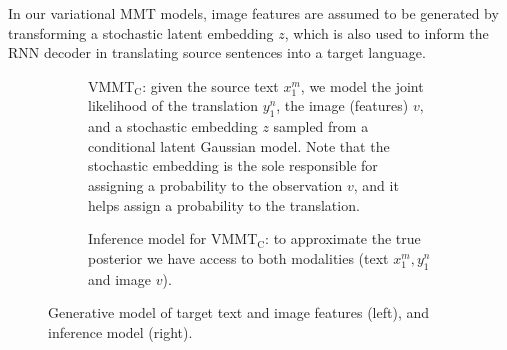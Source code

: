 \documentclass[11pt,a4paper]{article}
\newcommand{\cond}{VMMT$_{\text{C}}$\xspace}
\begin{document}
In our variational MMT models, image features are assumed to be generated by transforming a stochastic latent embedding $z$, which is 
also used to inform the RNN decoder in translating source sentences into a target language.

\begin{figure*}[ht!]
  \centering
  \begin{subfigure}[t]{0.45\linewidth}\centering
    \caption{\label{fig:vmmtc-gen}\cond: given the source text $x_1^m$, we model the joint likelihood of the translation $y_1^n$, the image (features) $v$, and a stochastic embedding $z$ sampled from a conditional latent Gaussian model. Note that the stochastic embedding is the sole responsible for assigning a probability to the observation $v$, and it helps assign a probability to the translation.}
  \end{subfigure}
  \hfill
  \begin{subfigure}[t]{0.45\linewidth}\centering
    \caption{\label{fig:vmmtc-inf}Inference model for \cond: to approximate the true posterior we have access to both modalities (text $x_1^m, y_1^n$ and image $v$).}
  \end{subfigure}
  \caption{\label{fig:vmmt}Generative model of target text and image features (left), and inference model (right).}
\end{figure*}
\end{document}
